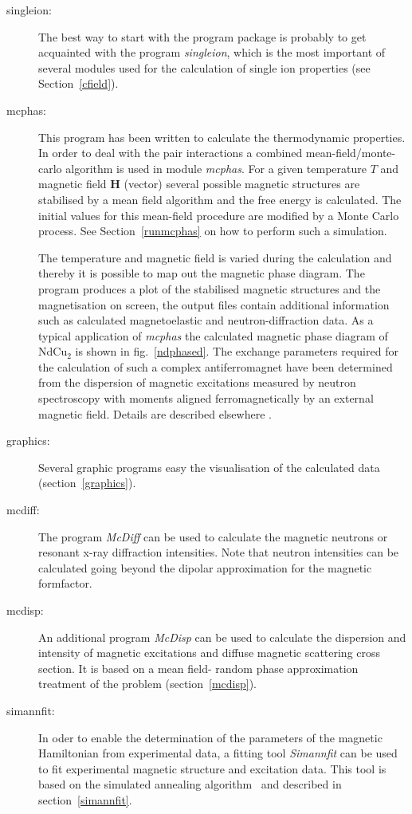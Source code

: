 \documentclass[twoside]{article}
\newcommand{\mbf}[1]{\mathbf #1}
\newcommand{\prg}{\sl}
\begin{document}
\begin{description}
\item[singleion:]
The best way to start with the program package is probably to get
acquainted with
the program {\prg singleion}, which is the most important of several 
modules used for the calculation of single ion properties (see Section~\ref{cfield}).
\item[mcphas:]
This program has been written to calculate the thermodynamic properties.
In order to  deal with the pair interactions a
 combined mean-field/monte-carlo algorithm is used in module {\prg mcphas}.
For a given temperature $T$ and magnetic field $\mbf H$ (vector)
 several possible magnetic structures are stabilised
by a mean field algorithm and the free energy is 
calculated. The initial values for this mean-field procedure are
modified by a Monte Carlo process.
See Section~\ref{runmcphas} on how to perform such a simulation.


The temperature and magnetic field is varied during the calculation
and thereby it is possible to map out the magnetic phase diagram.
The program produces a plot of the stabilised magnetic
structures and the magnetisation on screen, the
output files contain additional information 
such as calculated magnetoelastic and  neutron-diffraction
data. As a typical application of {\prg mcphas} the calculated magnetic
phase diagram of NdCu$_2$ is shown in fig.~\ref{ndphased}.
The exchange parameters required for the calculation of such a complex
antiferromagnet have
been determined from the dispersion of magnetic excitations
measured by neutron spectroscopy with moments aligned ferromagnetically
by an external magnetic field. Details are described elsewhere \cite{rotter00-29}.

\item[graphics:]
Several graphic programs easy the visualisation of the
calculated data (section~\ref{graphics}).

\item[mcdiff:]
The program {\prg McDiff} can be used to calculate the magnetic neutrons
or resonant x-ray diffraction intensities. Note that neutron intensities
can be calculated going beyond the dipolar approximation for the magnetic
formfactor.

\item[mcdisp:]
An additional program {\prg McDisp} can be used to calculate the 
dispersion and intensity
 of magnetic excitations and diffuse magnetic scattering cross section.
  It is based on a mean field- random
phase approximation treatment of the problem (section~\ref{mcdisp}). 
\item[simannfit:]
In oder to enable the determination of the parameters of the
magnetic Hamiltonian from experimental data, a fitting tool
{\prg Simannfit} can be used to fit experimental  magnetic structure and excitation
data. This tool is based on the simulated annealing 
algorithm~\cite{kirkpatrick83-671} and described in section~\ref{simannfit}.
\end{description}
\end{document}
